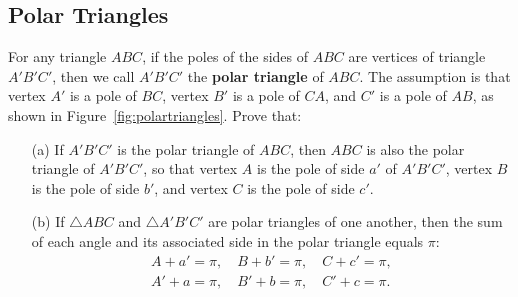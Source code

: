 \documentclass[12pt,a4paper]{memoir}
\theoremstyle{definition}
\begin{document}
\subsection{Polar Triangles}

	\begin{question}
		For any triangle $ABC$, if the poles of the sides of $ABC$ are vertices of triangle $A'B'C'$, then we call $A'B'C'$ the \textbf{polar triangle} of $ABC$. The assumption is that vertex $A'$ is a pole of $BC$, vertex $B'$ is a pole of $CA$, and $C'$ is a pole of $AB$, as shown in Figure~\ref{fig:polartriangles}. Prove that:
		\begin{enumerate}
			\item[(a)] If $A'B'C'$ is the polar triangle of $ABC$, then $ABC$ is also the polar triangle of $A'B'C'$, so that vertex $A$ is the pole of side $a'$ of $A'B'C'$, vertex $B$ is the pole of side $b'$, and vertex $C$ is the pole of side $c'$. 
			\item[(b)] If $\triangle ABC$ and $\triangle A'B'C'$ are polar triangles of one another, then the sum of each angle and its associated side in the polar triangle equals $\pi$:
			\begin{align*}
				A+a' = \pi, \quad B+b'=\pi, \quad C+c'=\pi,\\
				A'+a=\pi, \quad B'+b=\pi, \quad C'+c=\pi.
			\end{align*}
		\end{enumerate}
	\end{question}    
\end{document}
